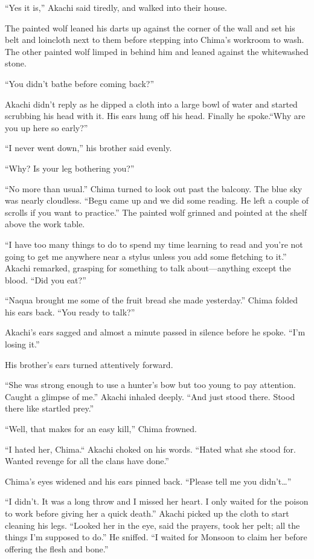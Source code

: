 ``Yes it is,'' Akachi said tiredly, and walked into their house.

The painted wolf leaned his darts up against the corner of the wall and set his belt and loincloth next to them before stepping into Chima's workroom to wash. The other painted wolf limped in behind him and leaned against the whitewashed stone.

``You didn't bathe before coming back?'' 

Akachi didn't reply as he dipped a cloth into a large bowl of water and started scrubbing his head with it. His ears hung off his head. Finally he spoke.``Why are you up here so early?''

``I never went down,'' his brother said evenly.

``Why? Is your leg bothering you?''

``No more than usual.'' Chima turned to look out past the balcony. The blue sky was nearly cloudless. ``Begu came up and we did some reading. He left a couple of scrolls if you want to practice.'' The painted wolf grinned and pointed at the shelf above the work table.

``I have too many things to do to spend my time learning to read and you're not going to get me anywhere near a stylus unless you add some fletching to it.'' Akachi remarked, grasping for something to talk about---anything except the blood. ``Did you eat?''

``Naqua brought me some of the fruit bread she made yesterday.'' Chima folded his ears back. ``You ready to talk?''

Akachi's ears sagged and almost a minute passed in silence before he spoke. ``I'm losing it.''

His brother's ears turned attentively forward.

``She was strong enough to use a hunter's bow but too young to pay attention. Caught a glimpse of me.'' Akachi inhaled deeply. ``And just stood there. Stood there like startled prey.''

``Well, that makes for an easy kill,'' Chima frowned. 

``I hated her, Chima.`` Akachi choked on his words. ``Hated what she stood for. Wanted revenge for all the clans have done.''

Chima's eyes widened and his ears pinned back. ``Please tell me you didn't\ldots''

``I didn't. It was a long throw and I missed her heart. I only waited for the poison to work before giving her a quick death.'' Akachi picked up the cloth to start cleaning his legs. ``Looked her in the eye, said the prayers, took her pelt; all the things I'm supposed to do.'' He sniffed. ``I  waited for Monsoon to claim her before offering the flesh and bone.''

